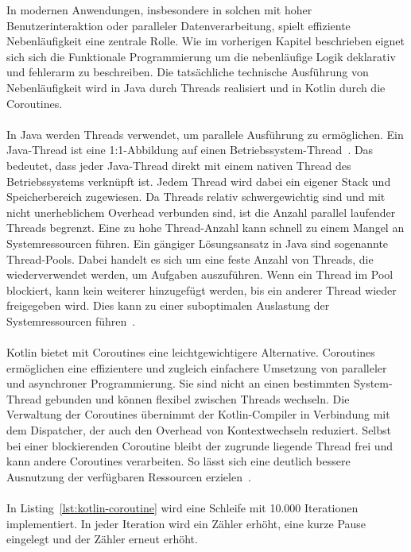 \documentclass[11pt]{article}
\begin{document}
    In modernen Anwendungen, insbesondere in solchen mit hoher Benutzerinteraktion oder paralleler Datenverarbeitung, spielt effiziente Nebenläufigkeit eine zentrale Rolle.
    Wie im vorherigen Kapitel beschrieben eignet sich sich die Funktionale Programmierung um die nebenläufige Logik deklarativ und fehlerarm zu beschreiben.
    Die tatsächliche technische Ausführung von Nebenläufigkeit wird in Java durch Threads realisiert und in Kotlin durch die Coroutines.\\
    \\
    In Java werden Threads verwendet, um parallele Ausführung zu ermöglichen.
    Ein Java-Thread ist eine 1:1-Abbildung auf einen Betriebssystem-Thread~\cite[940]{insel}.
    Das bedeutet, dass jeder Java-Thread direkt mit einem nativen Thread des Betriebssystems verknüpft ist.
    Jedem Thread wird dabei ein eigener Stack und Speicherbereich zugewiesen.
    Da Threads relativ schwergewichtig sind und mit nicht unerheblichem Overhead verbunden sind, ist die Anzahl parallel laufender Threads begrenzt.
    Eine zu hohe Thread-Anzahl kann schnell zu einem Mangel an Systemressourcen führen.
    Ein gängiger Lösungsansatz in Java sind sogenannte Thread-Pools.
    Dabei handelt es sich um eine feste Anzahl von Threads, die wiederverwendet werden, um Aufgaben auszuführen.
    Wenn ein Thread im Pool blockiert, kann kein weiterer hinzugefügt werden, bis ein anderer Thread wieder freigegeben wird.
    Dies kann zu einer suboptimalen Auslastung der Systemressourcen führen~\cite[965-966]{insel}.\\
    \\
    Kotlin bietet mit Coroutines eine leichtgewichtigere Alternative.
    Coroutines ermöglichen eine effizientere und zugleich einfachere Umsetzung von paralleler und asynchroner Programmierung.
    Sie sind nicht an einen bestimmten System-Thread gebunden und können flexibel zwischen Threads wechseln.
    Die Verwaltung der Coroutines übernimmt der Kotlin-Compiler in Verbindung mit dem Dispatcher, der auch den Overhead von Kontextwechseln reduziert.
    Selbst bei einer blockierenden Coroutine bleibt der zugrunde liegende Thread frei und kann andere Coroutines verarbeiten.
    So lässt sich eine deutlich bessere Ausnutzung der verfügbaren Ressourcen erzielen~\cite[194]{kotlin-patterns}.\\
    \\
    In Listing~\ref{lst:kotlin-coroutine} wird eine Schleife mit 10.000 Iterationen implementiert.
    In jeder Iteration wird ein Zähler erhöht, eine kurze Pause eingelegt und der Zähler erneut erhöht.
\end{document}
